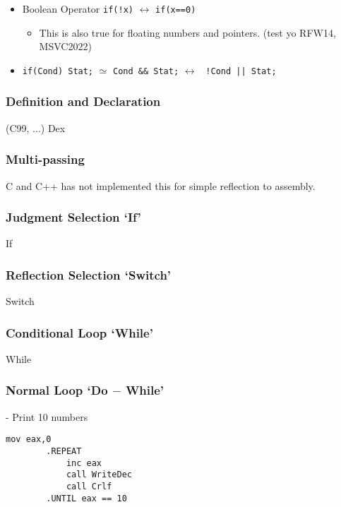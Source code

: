 \begin{itemize}
	\item{Boolean Operator \verb|if(!x)| $\leftrightarrow$ \verb|if(x==0)|
		\begin{itemize}\item This is also true for floating numbers and pointers. (test yo RFW14, MSVC2022) \end{itemize}
	}
	
	\item{\verb|if(Cond) Stat;| $\simeq$ \verb|Cond && Stat;| $\leftrightarrow$ \verb# !Cond || Stat; #
	}
\end{itemize}

\subsubsection{Definition and Declaration} (C99, ...)
{Dex}

\subsubsection{Multi-passing}

	C and C++ has not implemented this for simple reflection to assembly.

\subsubsection{Judgment Selection `If'}
{If}

\subsubsection{Reflection Selection `Switch'}
{Switch}

\subsubsection{Conditional Loop `While'}
{While}
	
\subsubsection{Normal Loop `Do $-$ While'}

	 - Print 10 numbers
	\begin{lstlisting}[language={[x86masm]Assembler}]
		mov eax,0
		.REPEAT
			inc eax
			call WriteDec
			call Crlf
		.UNTIL eax == 10
	\end{lstlisting}

